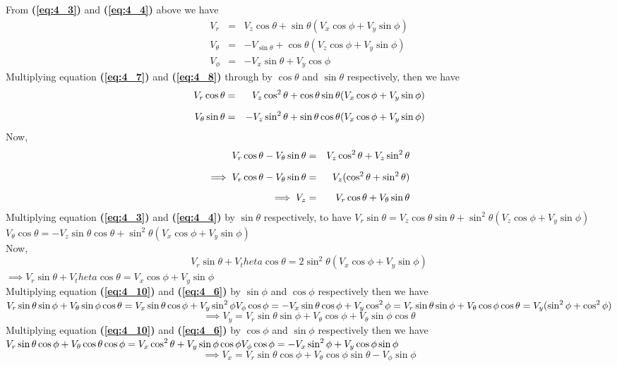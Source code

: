 \documentclass[a4paper, 12pt]{report}
\newcommand{\sps}{\\[0.2cm]}
\newcommand{\spn}[1]{\\[#1cm]}
\newcommand{\refn}[1]{\textbf{(\ref{#1})}}
\newcommand{\NI}{\noindent}
\newcommand{\dsp}{\displaystyle}
\begin{document}
\NI From \refn{eq:4_3} and \refn{eq:4_4} above we have
\begin{eqnarray}
	V_r &=& V_z\cos\theta + \sin\theta(V_x\cos\phi + V_y\sin\phi) \label{eq:4_7} \spn{0.1}
	V_\theta &=& -V_{\sin\theta} + \cos\theta(V_z\cos\phi + V_y\sin\phi) \label{eq:4_8} \spn{0.1}
	V_\phi &=& -V_x\sin\theta + V_y\cos\phi \label{eq:4_9}
\end{eqnarray}
Multiplying equation \refn{eq:4_7} and \refn{eq:4_8} through by $\cos\theta$ and $\sin\theta$ respectively, then we have
\begin{eqnarray}
	V_r\cos\theta &=& V_z\cos^2\theta + \cos\theta\sin\theta(V_x\cos\phi + V_y\sin\phi)\notag \sps
	V_\theta\sin\theta &=& -V_z\sin^2\theta + \sin\theta\cos\theta(V_x\cos\phi + V_y\sin\phi)\notag
\end{eqnarray}
Now,
\begin{eqnarray}
	V_r\cos\theta - V_\theta\sin\theta &=& V_z\cos^2\theta + V_z\sin^2\theta \notag \sps
	\implies V_r\cos\theta - V_\theta\sin\theta &=&V_z(\cos^2\theta + \sin^2\theta)\notag \sps
	\implies V_z &=& V_r\cos\theta + V_\theta\sin\theta \notag
\end{eqnarray}
Multiplying equation \refn{eq:4_3} and \refn{eq:4_4} by $\sin\theta$ respectively, to have $V_r\sin\theta = V_z\cos\theta\sin\theta + \sin^2\theta(V_z\cos\phi + V_y\sin\phi)$\\
$V_\theta\cos\theta = -V_z\sin\theta\cos\theta+\sin^2\theta(V_x\cos\phi + V_y\sin\phi)$\\

\NI Now,
\begin{equation}
	V_r\sin\theta + V_theta\cos\theta = 2\sin^2\theta(V_x\cos\phi + V_y\sin\phi) \label{eq:4_10}
\end{equation}
$\dsp
\implies V_r\sin\theta + V_theta\cos\theta = V_x\cos\phi + V_y\sin\phi
$\sps
Multiplying equation \refn{eq:4_10} and \refn{eq:4_6} by $\sin\phi$ and $\cos\phi$ respectively then we have\sps
$\dsp
V_r\sin\theta\sin\phi + V_\theta\sin\phi\cos\theta = V_x\sin\theta\cos\phi + V_y\sin^2\phi \sps
V_\phi\cos\phi = -V_x\sin\theta\cos\phi + V_y\cos^2\phi \sps
= V_r\sin\theta\sin\phi + V_\theta\cos\phi\cos\theta = V_y(\sin^2\phi + \cos^2\phi)\sps
$
\begin{equation}
	\implies V_y = V_r\sin\theta\sin\phi + V_\theta\cos\phi + V_\theta\sin\phi\cos\theta \label{eq:4_11}
\end{equation}
Multiplying equation \refn{eq:4_10} and \refn{eq:4_6} by $\cos\phi$ and $\sin\phi$ respectively then we have\sps
$\dsp
V_r\sin\theta\cos\phi + V_\theta\cos\theta\cos\phi = V_x\cos^2\theta + V_y\sin\phi\cos\phi \sps
V_\phi\cos\phi = - V_x\sin^2\phi + V_y\cos\phi\sin\phi
$
\begin{equation}
	\implies V_x = V_r\sin\theta\cos\phi + V_\theta\cos\phi\sin\theta - V_\phi\sin\phi \label{eq:4_12}
\end{equation}
\end{document}
